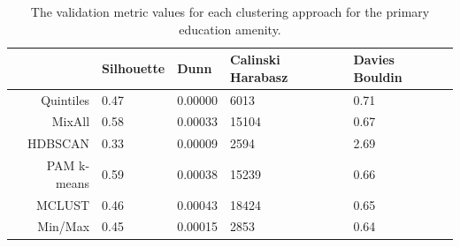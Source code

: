 \documentclass[11pt, a4paper]{article}
\begin{document}
\begin{table}[H]
\centering
\caption[Number of clusters by approach]{The number of clusters suggested by all approaches for each amenity in the PMD.}\label{numclusts}
\end{table}












\begin{longtable}[H]{|r|llll|}
\caption[Primary education validation metrics]{ The validation metric values for each clustering approach for the primary education amenity.}\label{prieducmetrics} 
\endfirsthead
\endhead
  \hline
 & Silhouette & Dunn & Calinski Harabasz & Davies Bouldin \\ 
  \hline
Quintiles & 0.47 & 0.00000 &  6013 & 0.71 \\ 
   \hline
MixAll & 0.58 & 0.00033 & 15104 & 0.67 \\ 
   \hline
HDBSCAN & 0.33 & 0.00009 &  2594 & 2.69 \\ 
   \hline
PAM k-means & \cellcolor{gray!25} 0.59 & 0.00038 & 15239 & 0.66 \\ 
   \hline
MCLUST & 0.46 & \cellcolor{gray!25} 0.00043 & \cellcolor{gray!25} 18424 & 0.65 \\ 
   \hline
Min/Max & 0.45 & 0.00015 &  2853 & \cellcolor{gray!25} 0.64 \\ 
   \hline
\end{longtable}
\end{document}
